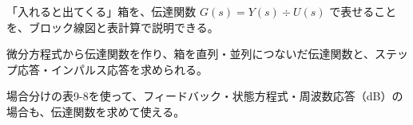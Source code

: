 \begin{furikaeri}
\begin{checklist}
\item 「入れると出てくる」箱を、伝達関数 $G(s)=Y(s)\div U(s)$ で表せることを、ブロック線図と表計算で説明できる。
\item 微分方程式から伝達関数を作り、箱を直列・並列につないだ伝達関数と、ステップ応答・インパルス応答を求められる。
\item 場合分けの表9-8を使って、フィードバック・状態方程式・周波数応答（dB）の場合も、伝達関数を求めて使える。
\end{checklist}
\end{furikaeri}

